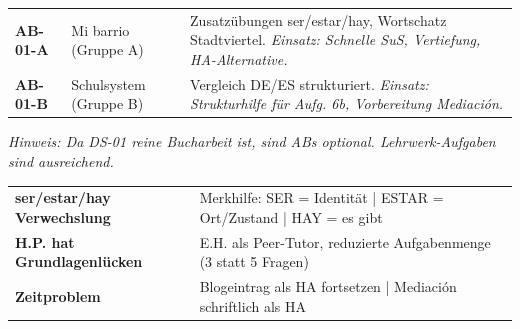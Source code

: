 \documentclass[11pt, a4paper]{article}
\begin{document}
\begin{tcolorbox}[
    colback=hellgrau,
    colframe=phase,
    title={\footnotesize\bfseries Optionale Arbeitsblätter (nicht zwingend erforderlich)},
    fonttitle=\bfseries,
    boxrule=0.5pt,
    top=2pt, bottom=2pt, left=4pt, right=4pt
]
\footnotesize
\begin{tabularx}{\textwidth}{@{}lp{3.5cm}X@{}}
\textbf{AB-01-A} & Mi barrio (Gruppe A) & Zusatzübungen ser/estar/hay, Wortschatz Stadtviertel. \textit{Einsatz: Schnelle SuS, Vertiefung, HA-Alternative.} \\[0.2em]
\textbf{AB-01-B} & Schulsystem (Gruppe B) & Vergleich DE/ES strukturiert. \textit{Einsatz: Strukturhilfe für Aufg. 6b, Vorbereitung Mediación.} \\
\end{tabularx}

\vspace{0.1cm}
\textit{Hinweis: Da DS-01 reine Bucharbeit ist, sind ABs optional. Lehrwerk-Aufgaben sind ausreichend.}
\end{tcolorbox}

\vspace{0.2cm}


\begin{tcolorbox}[
    colback=white,
    colframe=spanisch,
    title={\footnotesize\bfseries Erwartete Schwierigkeiten},
    fonttitle=\bfseries,
    boxrule=0.5pt,
    top=2pt, bottom=2pt, left=4pt, right=4pt
]
\footnotesize
\begin{tabularx}{\textwidth}{@{}p{4.5cm}X@{}}
\textbf{ser/estar/hay Verwechslung} & Merkhilfe: SER = Identität | ESTAR = Ort/Zustand | HAY = es gibt \\
\textbf{H.P. hat Grundlagenlücken} & E.H. als Peer-Tutor, reduzierte Aufgabenmenge (3 statt 5 Fragen) \\
\textbf{Zeitproblem} & Blogeintrag als HA fortsetzen | Mediación schriftlich als HA \\
\end{tabularx}
\end{tcolorbox}
\end{document}
